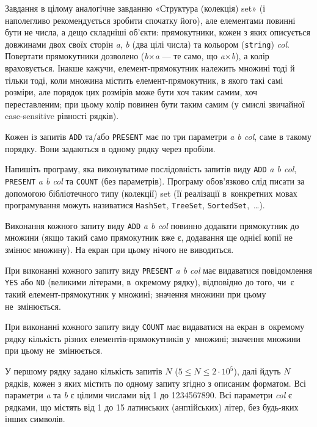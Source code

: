 Завдання в цілому аналогічне завданню «Структура (колекція) set» (і наполегливо рекомендується зробити спочатку його), але елементами повинні бути не числа, а дещо складніші об'єкти: прямокутники, кожен з яких описується довжинами двох своїх сторін {\it a}, {\it b} (два цілі числа) та кольором ({\tt string}) {\it col}. Повертати прямокутники дозволено ({\it b}×{\it a} — те само, що {\it a}×{\it b}), а колір враховується. Інакше кажучи, елемент-прямокутник належить множині тоді й тільки тоді, коли множина містить елемент-прямокутник, в якого такі самі розміри, але порядок цих розмірів може бути хоч таким самим, хоч переставленим; при цьому колір повинен бути таким самим (у смислі звичайної case-sensitive рівності рядків).

Кожен із запитів {\tt ADD} та/або {\tt PRESENT} має по три параметри {\it a b col}, саме в такому порядку. Вони задаються в одному рядку через пробіли.

Напишіть програму, яка виконуватиме послідовність запитів виду {\tt ADD} {\it a b col}, {\tt PRESENT} {\it a b col} та {\tt COUNT} (без параметрів). Програму обов'язково слід писати за допомогою бібліотечного типу (колекції) set (її реалізації в~конкретних мовах програмування можуть називатися {\tt HashSet}, {\tt TreeSet}, {\tt SortedSet},~\dots).

Виконання кожного запиту виду {\tt ADD} {\it a b col} повинно додавати прямокутник до множини (якщо такий само прямокутник вже є, додавання ще однієї копії не змінює множину). На екран при цьому нічого не виводиться.

При виконанні кожного запиту виду {\tt PRESENT} {\it a b col} має видаватися повідомлення {\tt YES} або {\tt NO} (великими літерами, в~окремому рядку), відповідно до того, чи~є такий елемент-прямокутник у множині; значення множини при цьому не~змінюється.

При виконанні кожного запиту виду {\tt COUNT} має видаватися на екран в~окремому рядку кількість різних елементів-прямокутників у~множині; значення множини при цьому не~змінюється.


\InputFile

У першому рядку задано кількість запитів $N$ ($5\leqslant N\leqslant 2\cdot10^5$), далі йдуть $N$ рядків, кожен з яких містить по одному запиту згідно з описаним форматом. Всі параметри {\it a} та {\it b} є цілими числами від 1 до 1234567890. Всі параметри {\it col} є рядками, що містять від 1 до 15 латинських (англійських) літер, без будь-яких інших символів. 



